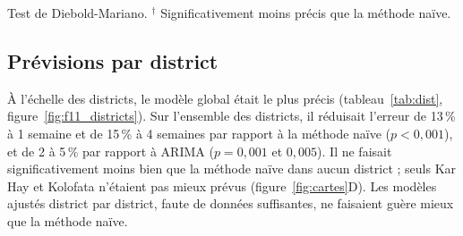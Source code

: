\documentclass[11pt]{article}
\begin{document}
\begin{table}[!htbp]\centering\small
\caption{Précision des prévisions régionales, 2023-2025 (156 semaines à 1 semaine, 153 à 4 semaines). MAE et RMSE en cas par semaine.}\label{tab:reg}
\par\smallskip\raggedright Test de Diebold-Mariano. $^{\dagger}$ Significativement moins précis que la méthode naïve.
\end{table}


\subsection{Prévisions par district}
À l'échelle des districts, le modèle global était le plus précis (tableau~\ref{tab:dist}, figure~\ref{fig:f11_districts}). Sur l'ensemble des districts, il réduisait l'erreur de 13\,\% à 1 semaine et de 15\,\% à 4 semaines par rapport à la méthode naïve ($p<0{,}001$), et de 2 à 5\,\% par rapport à ARIMA ($p=0{,}001$ et $0{,}005$). Il ne faisait significativement moins bien que la méthode naïve dans aucun district ; seuls Kar Hay et Kolofata n'étaient pas mieux prévus (figure~\ref{fig:cartes}D). Les modèles ajustés district par district, faute de données suffisantes, ne faisaient guère mieux que la méthode naïve.
\end{document}
